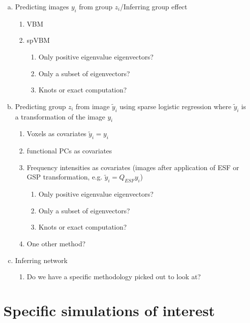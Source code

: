 \documentclass[12pt]{article}
\begin{document}
\begin{enumerate}[(a)]
	\item Predicting images $y_i$ from group $z_i$/Inferring group effect
	      \begin{enumerate}[(1)]
		      \item VBM
		      \item spVBM
		            \begin{enumerate}
			            \item Only positive eigenvalue eigenvectors?
			            \item Only a subset of eigenvectors?
			            \item Knots or exact computation?
		            \end{enumerate}
	      \end{enumerate}
	\item Predicting group $z_i$ from image $\tilde y_i$ using sparse logistic regression where $\tilde y_i$ is a transformation of the image $y_i$
	      \begin{enumerate}[(1)]
		      \item Voxels as covariates $\tilde y_i=y_i$
		      \item functional PCs as covariates
		      \item Frequency intensities as covariates (images after application of ESF or GSP transformation, e.g. $\tilde y_i=Q_{ESF}y_i$)
		            \begin{enumerate}
			            \item Only positive eigenvalue eigenvectors?
			            \item Only a subset of eigenvectors?
			            \item Knots or exact computation?
		            \end{enumerate}
		      \item One other method?
	      \end{enumerate}
	\item Inferring network
	      \begin{enumerate}
		      \item Do we have a specific methodology picked out to look at?
	      \end{enumerate}
\end{enumerate}



\section*{Specific simulations of interest}
\end{document}
